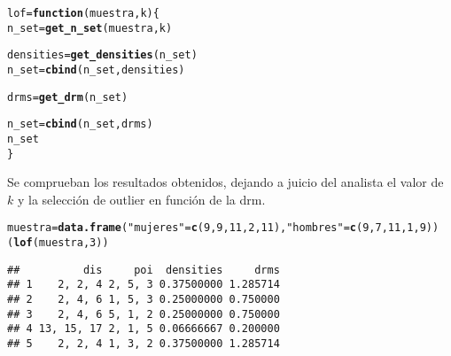 \documentclass[12pt]{report}\usepackage[]{graphicx}\usepackage[dvipsnames]{xcolor}
\makeatletter
\newcommand{\hlnum}[1]{\textcolor[rgb]{0.686,0.059,0.569}{#1}}%
\newcommand{\hlstr}[1]{\textcolor[rgb]{0.192,0.494,0.8}{#1}}%
\newcommand{\hlstd}[1]{\textcolor[rgb]{0.345,0.345,0.345}{#1}}%
\newcommand{\hlkwa}[1]{\textcolor[rgb]{0.161,0.373,0.58}{\textbf{#1}}}%
\newcommand{\hlkwb}[1]{\textcolor[rgb]{0.69,0.353,0.396}{#1}}%
\newcommand{\hlkwc}[1]{\textcolor[rgb]{0.333,0.667,0.333}{#1}}%
\newcommand{\hlkwd}[1]{\textcolor[rgb]{0.737,0.353,0.396}{\textbf{#1}}}%
\newenvironment{kframe}{%
 \def\at@end@of@kframe{}%
 \ifinner\ifhmode%
  \def\at@end@of@kframe{\end{minipage}}%
  \begin{minipage}{\columnwidth}%
 \fi\fi%
 \def\FrameCommand##1{\hskip\@totalleftmargin \hskip-\fboxsep
 \colorbox{shadecolor}{##1}\hskip-\fboxsep
     \hskip-\linewidth \hskip-\@totalleftmargin \hskip\columnwidth}%
 \MakeFramed {\advance\hsize-\width
   \@totalleftmargin\z@ \linewidth\hsize
   \@setminipage}}%
 {\par\unskip\endMakeFramed%
 \at@end@of@kframe}
\newenvironment{knitrout}{}{} %
\makeatother
\begin{document}
\begin{knitrout}
\color{fgcolor}\begin{kframe}
\begin{alltt}
\hlstd{lof} \hlkwb{=} \hlkwa{function}\hlstd{(}\hlkwc{muestra}\hlstd{,} \hlkwc{k}\hlstd{) \{}
        \hlstd{n_set} \hlkwb{=} \hlkwd{get_n_set}\hlstd{(muestra, k)}

        \hlstd{densities} \hlkwb{=} \hlkwd{get_densities}\hlstd{(n_set)}
        \hlstd{n_set} \hlkwb{=} \hlkwd{cbind}\hlstd{(n_set, densities)}

        \hlstd{drms} \hlkwb{=} \hlkwd{get_drm}\hlstd{(n_set)}

        \hlstd{n_set} \hlkwb{=} \hlkwd{cbind}\hlstd{(n_set, drms)}
        \hlstd{n_set}
\hlstd{\}}
\end{alltt}
\end{kframe}
\end{knitrout}
						
						Se comprueban los resultados obtenidos, dejando a juicio del analista el valor de $k$ y la selección de outlier en función de la drm. 
						
\begin{knitrout}
\color{fgcolor}\begin{kframe}
\begin{alltt}
\hlstd{muestra} \hlkwb{=} \hlkwd{data.frame}\hlstd{(}\hlstr{"mujeres"} \hlstd{=} \hlkwd{c}\hlstd{(}\hlnum{9}\hlstd{,}\hlnum{9}\hlstd{,}\hlnum{11}\hlstd{,}\hlnum{2}\hlstd{,}\hlnum{11}\hlstd{),} \hlstr{"hombres"} \hlstd{=} \hlkwd{c}\hlstd{(}\hlnum{9}\hlstd{,}\hlnum{7}\hlstd{,}\hlnum{11}\hlstd{,}\hlnum{1}\hlstd{,}\hlnum{9}\hlstd{))}
\hlstd{(}\hlkwd{lof}\hlstd{(muestra,} \hlnum{3}\hlstd{))}
\end{alltt}
\begin{verbatim}
##          dis     poi  densities     drms
## 1    2, 2, 4 2, 5, 3 0.37500000 1.285714
## 2    2, 4, 6 1, 5, 3 0.25000000 0.750000
## 3    2, 4, 6 5, 1, 2 0.25000000 0.750000
## 4 13, 15, 17 2, 1, 5 0.06666667 0.200000
## 5    2, 2, 4 1, 3, 2 0.37500000 1.285714
\end{verbatim}
\end{kframe}
\end{knitrout}
	
\end{document}
